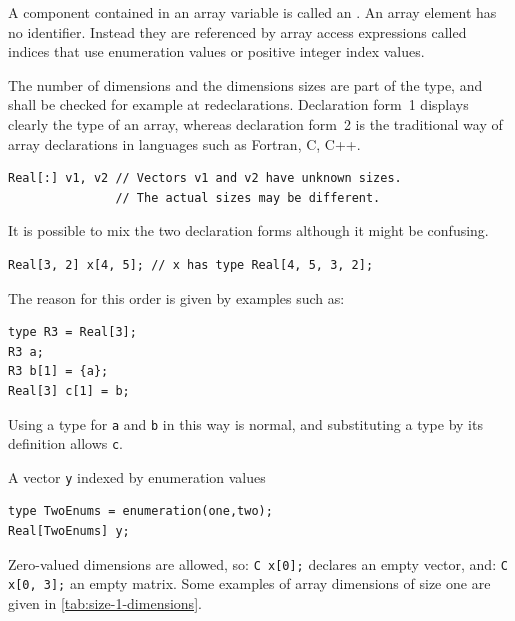 A component contained in an array variable is called an .
An array element has no identifier.
Instead they are referenced by array access expressions called indices that use enumeration values or positive integer index values.

\begin{example}
The number of dimensions and the dimensions sizes are part of the type, and shall be checked for example at redeclarations.
Declaration form~1 displays clearly the type of an array, whereas declaration form~2 is the traditional way of array declarations in languages such as Fortran, C, C++.

\begin{lstlisting}[language=modelica]
Real[:] v1, v2 // Vectors v1 and v2 have unknown sizes.
               // The actual sizes may be different.
\end{lstlisting}
It is possible to mix the two declaration forms although it might be confusing.
\begin{lstlisting}[language=modelica]
Real[3, 2] x[4, 5]; // x has type Real[4, 5, 3, 2];
\end{lstlisting}
The reason for this order is given by examples such as:
\begin{lstlisting}[language=modelica]
type R3 = Real[3];
R3 a;
R3 b[1] = {a};
Real[3] c[1] = b;
\end{lstlisting}
Using a type for \lstinline!a! and \lstinline!b! in this way is normal, and substituting a type by its definition allows \lstinline!c!.

A vector \lstinline!y! indexed by enumeration values
\begin{lstlisting}[language=modelica]
type TwoEnums = enumeration(one,two);
Real[TwoEnums] y;
\end{lstlisting}
\end{example}

Zero-valued dimensions are allowed, so: \lstinline!C x[0];! declares an empty vector, and: \lstinline!C x[0, 3];! an empty matrix.
Some examples of array dimensions of size one are given in \cref{tab:size-1-dimensions}.

